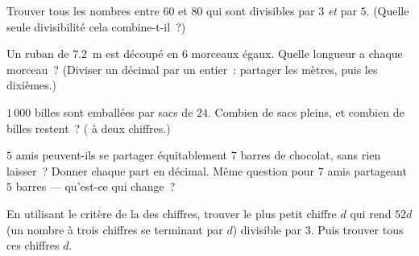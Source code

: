 \begin{exercise}[$\star$]\label{exo:g5:division:7}
Trouver tous les nombres entre $60$ et $80$ qui sont divisibles par
$3$ \emph{et} par $5$. (Quelle seule divisibilité cela
combine-t-il~?)
\end{exercise}

\begin{exercise}[$\star$]\label{exo:g5:division:8}
Un ruban de $7.2$~m est découpé en $6$ morceaux égaux. Quelle
longueur a chaque morceau~? (Diviser un décimal par un entier~:
partager les mètres, puis les dixièmes.)
\end{exercise}

\begin{exercise}[$\star$]\label{exo:g5:division:9}
$1\,000$ billes sont emballées par sacs de $24$. Combien de sacs
pleins, et combien de billes restent~? ( à deux chiffres.)
\end{exercise}

\begin{exercise}[$\star\star$]\label{exo:g5:division:10}
$5$ amis peuvent-ils se partager équitablement $7$ barres de
chocolat, sans rien laisser~? Donner chaque part en décimal. Même
question pour $7$ amis partageant $5$ barres --- qu'est-ce qui
change~?
\end{exercise}

\begin{exercise}[$\star\star$]\label{exo:g5:division:11}
En utilisant le critère de la  des chiffres, trouver le plus
petit chiffre $d$ qui rend $52d$ (un nombre à trois chiffres se
terminant par $d$) divisible par $3$. Puis trouver tous ces
chiffres $d$.
\end{exercise}
